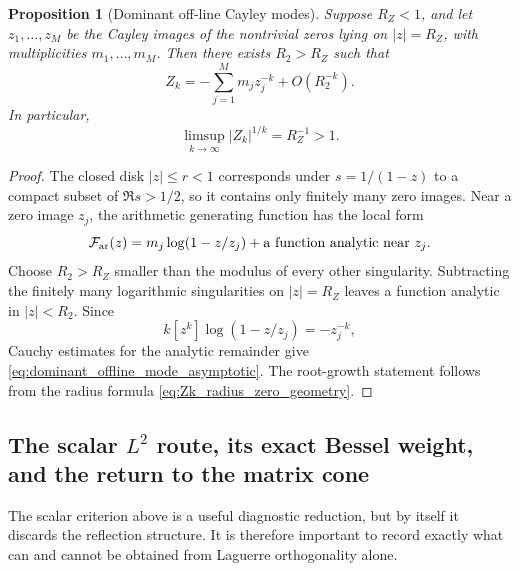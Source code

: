 \documentclass[11pt]{amsart}
\numberwithin{equation}{section}
\theoremstyle{plain}
\newtheorem{proposition}[theorem]{Proposition}
\theoremstyle{definition}
\theoremstyle{remark}
\begin{document}
\begin{proposition}[Dominant off-line Cayley modes]
\label{prop:dominant_offline_modes}
Suppose $R_Z<1$, and let $z_1,\dots,z_M$ be the Cayley images of the nontrivial zeros lying on $|z|=R_Z$, with multiplicities $m_1,\dots,m_M$.  Then there exists $R_2>R_Z$ such that
\begin{equation}
 Z_k
 =-\sum_{j=1}^{M}m_jz_j^{-k}
 +O(R_2^{-k}).
 \label{eq:dominant_offline_mode_asymptotic}
\end{equation}
In particular,
\begin{equation}
 \limsup_{k\to\infty}|Z_k|^{1/k}=R_Z^{-1}>1.
 \label{eq:dominant_offline_root_growth}
\end{equation}
\end{proposition}

\begin{proof}
The closed disk $|z|\le r<1$ corresponds under $s=1/(1-z)$ to a compact subset of $\Re s>1/2$, so it contains only finitely many zero images.  Near a zero image $z_j$, the arithmetic generating function has the local form
\begin{equation}
 \mathcal F_{\rm ar}(z)
 =m_j\log(1-z/z_j)+\text{a function analytic near }z_j.
\end{equation}
Choose $R_2>R_Z$ smaller than the modulus of every other singularity.  Subtracting the finitely many logarithmic singularities on $|z|=R_Z$ leaves a function analytic in $|z|<R_2$.  Since
\begin{equation}
 k[z^k]\log(1-z/z_j)=-z_j^{-k},
\end{equation}
Cauchy estimates for the analytic remainder give \eqref{eq:dominant_offline_mode_asymptotic}.  The root-growth statement follows from the radius formula \eqref{eq:Zk_radius_zero_geometry}.
\end{proof}


\subsection{\texorpdfstring{The scalar $L^2$ route, its exact Bessel weight, and the return to the matrix cone}{The scalar L2 route, its exact Bessel weight, and the return to the matrix cone}}
\label{subsec:scalar_L2_barrier_matrix_return}

The scalar criterion above is a useful diagnostic reduction, but by itself it discards the reflection structure.  It is therefore important to record exactly what can and cannot be obtained from Laguerre orthogonality alone.
\end{document}
